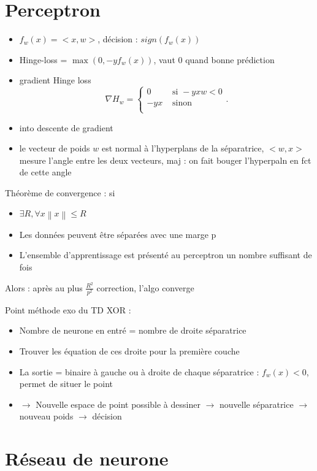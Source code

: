 \documentclass{article}
\theoremstyle{plain}%
\theoremstyle{definition}
\theoremstyle{remark}
\begin{document}
\section{Perceptron}
\begin{itemize}
    \item $ f_w(x) = <x, w> $, décision : $ sign(f_w(x)) $  
    \item Hinge-loss = $ \max (0, -y f_w(x)) $, vaut 0 quand bonne prédiction
    \item gradient Hinge loss 
    \[
        \nabla H_w = \begin{cases}
        0 &\text{ si } -y x w < 0\\
        -yx &\text{ sinon}\\
        \end{cases} 
    .\]
    \item into descente de gradient
    \item le vecteur de poids $ w $ est normal à l'hyperplans de la séparatrice, $ <w, x> $ mesure l'angle entre les deux vecteurs, maj : on fait bouger l'hyperpaln en fct de cette angle 
\end{itemize}
Théorème de convergence : si
\begin{itemize}
    \item $ \exists R, \forall x \left\| x \right\| \leq R $ 
    \item Les données peuvent être séparées avec une marge p
    \item L'ensemble d'apprentissage est présenté au perceptron un nombre suffisant
    de fois
\end{itemize}
Alors : après au plus $ \frac{R^2}{p^2} $ correction, l'algo converge

Point méthode exo du TD XOR : 
\begin{itemize}
    \item Nombre de neurone en entré = nombre de droite séparatrice
    \item Trouver les équation de ces droite pour la première couche
    \item La sortie = binaire à gauche ou à droite de chaque séparatrice : $ f_w(x) < 0 $, permet de situer le point 
    \item $\rightarrow$ Nouvelle espace de point possible à dessiner $\rightarrow$ nouvelle séparatrice $\rightarrow$ nouveau poids $\rightarrow$ décision
\end{itemize}
\section{Réseau de neurone}
\end{document}
